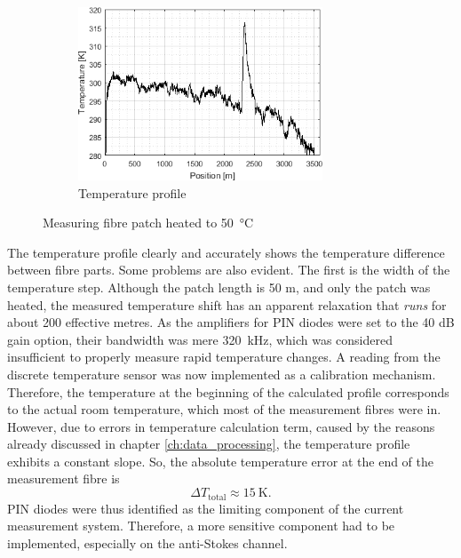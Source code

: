 \documentclass{standalone}
\begin{document}
\begin{figure}[h]
	\begin{subfigure}[b]{\textwidth}
		\centering
		\includegraphics[width=0.8\textwidth]{first_50c_temp.png}
		\caption{Temperature profile}
	\end{subfigure}
	\caption{Measuring fibre patch heated to \SI{50}{\celsius}}
	\label{fig:first_50c}
\end{figure}
The temperature profile clearly and accurately shows the temperature difference between fibre parts. Some problems are also evident. The first is the width of the temperature step. Although the patch length is 50 m, and only the patch was heated, the measured temperature shift has an apparent relaxation that \textit{runs} for about 200 effective metres. As the amplifiers for PIN diodes were set to the 40 dB gain option, their bandwidth was mere \SI{320}{\kilo \hertz}, which was considered insufficient to properly measure rapid temperature changes. A reading from the discrete temperature sensor was now implemented as a calibration mechanism. Therefore, the temperature at the beginning of the calculated profile corresponds to the actual room temperature, which most of the measurement fibres were in. However, due to errors in temperature calculation term, caused by the reasons already discussed in chapter \ref{ch:data_processing}, the temperature profile exhibits a constant slope. So, the absolute temperature error at the end of the measurement fibre is 
\begin{equation}
\varDelta T_\textrm{total} \approx \SI{15}{\kelvin} \textrm{.}
\end{equation}
PIN diodes were thus identified as the limiting component of the current measurement system. Therefore, a more sensitive component had to be implemented, especially on the anti-Stokes channel.
\end{document}
